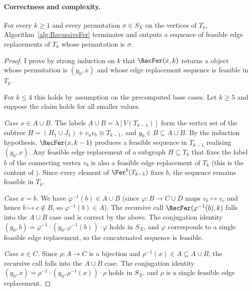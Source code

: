 \paragraph{Correctness and complexity.}

\begin{theorem}[Correctness]\label{thm:algorithm_correct}
    For every $k \ge 1$ and every permutation $\sigma \in S_X$ on the vertices of $T_k$, Algorithm~\ref{alg:RecursiveFer} terminates and outputs a sequence of feasible edge replacements of $T_k$ whose permutation is $\sigma$.
\end{theorem}

\begin{proof}
    I prove by strong induction on $k$ that $\RecFer(x,k)$ returns a \tfer object whose permutation is $(y_0,x)$ and whose edge replacement sequence is feasible in $T_k$.

    For $k\leq 4$ this holds by assumption on the precomputed base cases.
    Let $k\geq 5$ and suppose the claim holds for all smaller values.

    \emph{Case $x \in A \cup B$.}
    The labels $A \cup B = \lambda[V(T_{k-1})]$ form the vertex set of the subtree $H = (H_1 \cup J_1) + v_a v_b \cong T_{k-1}$, and $y_0 \in B\subseteq A \cup B$.
    By the induction hypothesis, $\RecFer(x, k-1)$ produces a feasible sequence in $T_{k-1}$ realising $(y_0,x)$.
    Any feasible edge replacement of a subgraph $H \subseteq T_k$ that fixes the label $b$ of the connecting vertex $v_b$ is also a feasible edge replacement of $T_k$ (this is the content of \cite[Lemma~5]{Eslavaetal2025}).
    Since every element of $\Fer^b(T_{k-1})$ fixes $b$, the sequence remains feasible in $T_k$.

    \emph{Case $x = b$.}
    We have $\varphi^{-1}(b) \in A \cup B$ (since $\varphi \colon B \to C \cup D$ maps $v_b \mapsto v_c$ and hence $b \mapsto c \notin B$, so $\varphi^{-1}(b) \in A$).
    The recursive call $\RecFer(\varphi^{-1}(b), k)$ falls into the $A \cup B$ case and is correct by the above.
    The conjugation identity $(y_0, b) = \varphi^{-1} \cdot (y_0, \varphi^{-1}(b)) \cdot \varphi$
    holds in $S_X$, and $\varphi$ corresponds to a single feasible edge replacement, so the concatenated sequence is feasible.

    \emph{Case $x \in C$.}
    Since $\rho \colon A \to C$ is a bijection and $\rho^{-1}(x) \in A \subseteq A \cup B$, the recursive call falls into the $A \cup B$ case.
    The conjugation identity $(y_0, x) = \rho^{-1} \cdot (y_0, \rho^{-1}(x)) \cdot \rho$ holds in $S_X$, and $\rho$ is a single feasible edge replacement.


\end{proof}
